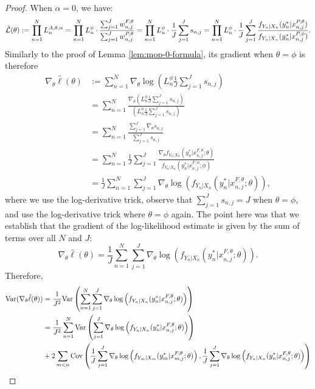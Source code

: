 \begin{proof}
When $\alpha=0$, we have:
\begin{equation}
    \hat{\mathcal{L}}(\theta) := \prod_{n=1}^N L_n^{A, \theta, \alpha} = \prod_{n=1}^N L_n^\phi \cdot \frac{\sum_{j=1}^J w_{n,j}^{F,\theta}}{\sum_{j=1}^J w_{n,j}^{P,\theta}} = \prod_{n=1}^N L_n^\phi \cdot \frac{1}{J}\sum_{j=1}^J s_{n,j} = \prod_{n=1}^N L_n^\phi \cdot \frac{1}{J}\sum_{j=1}^J \frac{f_{Y_n|X_n}(y_n^*|x_{n,j}^{P, \theta})}{f_{Y_n|X_n}(y_n^*|x_{n,j}^{P, \phi})}.
\end{equation}
Similarly to the proof of Lemma \ref{lem:mop-0-formula}, its gradient when $\theta=\phi$ is therefore 
\begin{align*}
    \nabla_\theta \hat{\ell}(\theta) &:= \sum_{n=1}^N \nabla_\theta \log\left(L_n^\phi \frac{1}{J} \sum_{j=1}^J s_{n,j}\right) \\
    &= \sum_{n=1}^N \frac{\nabla_\theta \left(L_n^\phi \frac{1}{J} \sum_{j=1}^J s_{n,j}\right)}{\left(L_n^\phi \frac{1}{J} \sum_{j=1}^J s_{n,j}\right)} \\
    &= \sum_{n=1}^N \frac{\sum_{j=1}^J \nabla_\theta s_{n,j}}{\sum_{j=1}^J s_{n,j}} \\
    &= \sum_{n=1}^N \frac{1}{J} \sum_{j=1}^J \frac{\nabla_\theta f_{Y_n|X_{n}}(y_n^*|x_{n,j}^{F, \theta}; \theta)}{f_{Y_n|X_{n}}(y_n^*|x_{n,j}^{F, \phi}; \phi)} \\
    &= \frac{1}{J} \sum_{n=1}^N \sum_{j=1}^J \nabla_\theta \log\left(f_{Y_n|X_{n}}(y_n^*|x_{n,j}^{F, \theta}; \theta)\right),
\end{align*}
where we use the log-derivative trick, observe that $\sum_{j=1}^J s_{n,j} = J$ when $\theta=\phi$, and use the log-derivative trick where $\theta=\phi$ again. The point here was that we establish that the gradient of the log-likelihood estimate is given by the sum of terms over all $N$ and $J$:
$$\nabla_\theta \hat{\ell}(\theta) = \frac{1}{J} \sum_{n=1}^N \sum_{j=1}^J \nabla_\theta \log\left(f_{Y_n|X_{n}}(y_n^*|x_{n,j}^{F, \theta}; \theta)\right).$$
Therefore,
\begin{align*}
    \Var(\nabla_\theta \hat\ell(\theta)) &= \frac{1}{J^2}\Var\left(\sum_{n=1}^N\sum_{j=1}^{J}\nabla_\theta \log\left(f_{Y_n|X_{n}}(y_n^*|x_{n,j}^{F, \theta}; \theta)\right)\right) \\
    &= \frac{1}{J^2}\sum_{n=1}^N\Var\left(\sum_{j=1}^{J}\nabla_\theta \log\left(f_{Y_n|X_{n}}(y_n^*|x_{n,j}^{F, \theta}; \theta)\right)\right) \\
    &+ 2\sum_{m<n}\Cov\left(\frac{1}{J}\sum_{j=1}^{J}\nabla_\theta \log\left(f_{Y_m|X_{m}}(y_m^*|x_{m,j}^{F, \theta}; \theta)\right), \frac{1}{J}\sum_{j=1}^{J}\nabla_\theta \log\left(f_{Y_n|X_{n}}(y_n^*|x_{n,j}^{F, \theta}; \theta)\right)\right) \\

\end{align*}
\end{proof}
